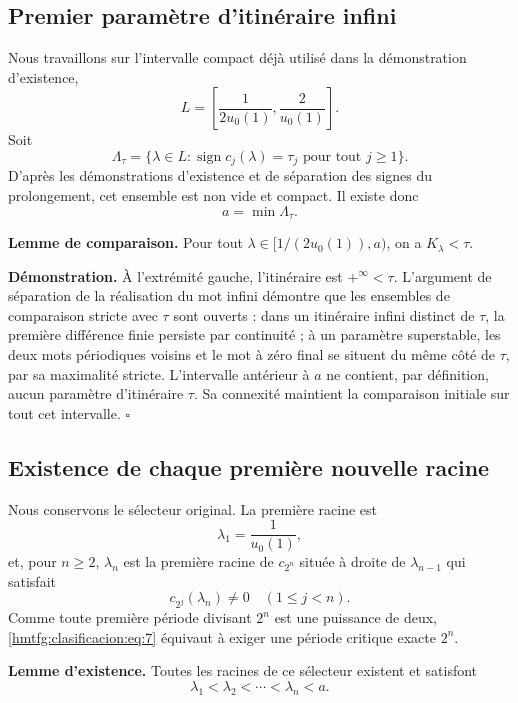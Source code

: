 \subsection{Premier paramètre d’itinéraire infini}
\label{hmtfg:clasificacion:3}

Nous travaillons sur l’intervalle compact déjà utilisé dans la démonstration d’existence,
\[
L=\left[\frac1{2u_0(1)},\frac2{u_0(1)}\right].
\]
Soit
\[
\Lambda_\tau=\{\lambda\in L:
\operatorname{sign}c_j(\lambda)=\tau_j\text{ pour tout }j\ge1\}.
\]
D’après les démonstrations d’existence et de séparation des signes du prolongement, cet ensemble est non vide et compact. Il existe donc
\begin{equation}
a=\min\Lambda_\tau.
\label{hmtfg:clasificacion:eq:6}
\end{equation}

\textbf{Lemme de comparaison.} Pour tout \(\lambda\in[1/(2u_0(1)),a)\), on a \(K_\lambda<\tau\).

\textbf{Démonstration.} À l’extrémité gauche, l’itinéraire est \(+^\infty<\tau\). L’argument de séparation de la réalisation du mot infini démontre que les ensembles de comparaison stricte avec \(\tau\) sont ouverts : dans un itinéraire infini distinct de \(\tau\), la première différence finie persiste par continuité ; à un paramètre superstable, les deux mots périodiques voisins et le mot à zéro final se situent du même côté de \(\tau\), par sa maximalité stricte. L’intervalle antérieur à \(a\) ne contient, par définition, aucun paramètre d’itinéraire \(\tau\). Sa connexité maintient la comparaison initiale sur tout cet intervalle. \(\square\)


\subsection{Existence de chaque première nouvelle racine}
\label{hmtfg:clasificacion:4}

Nous conservons le sélecteur original. La première racine est
\[
\lambda_1=\frac1{u_0(1)},
\]
et, pour \(n\ge2\), \(\lambda_n\) est la première racine de \(c_{2^n}\) située à droite de \(\lambda_{n-1}\) qui satisfait
\begin{equation}
c_{2^j}(\lambda_n)\ne0\quad(1\le j<n).
\label{hmtfg:clasificacion:eq:7}
\end{equation}
Comme toute première période divisant \(2^n\) est une puissance de deux, \eqref{hmtfg:clasificacion:eq:7} équivaut à exiger une période critique exacte \(2^n\).

\textbf{Lemme d’existence.} Toutes les racines de ce sélecteur existent et satisfont
\begin{equation}
\lambda_1<\lambda_2<\cdots<\lambda_n<a.
\label{hmtfg:clasificacion:eq:8}
\end{equation}

